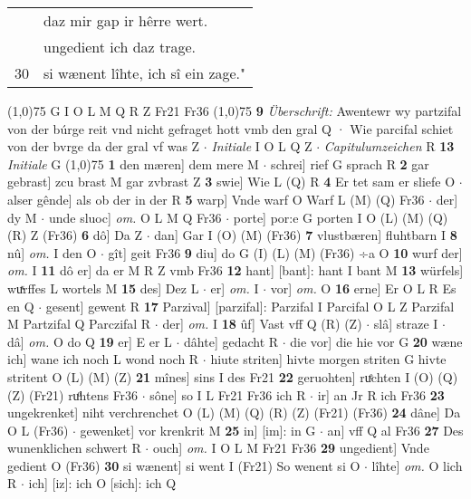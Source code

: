 \documentclass[8pt,a4paper,notitlepage]{article}
\begin{document}
\begin{table}[ht]
\begin{minipage}[t]{0.5\linewidth}
\begin{tabular}{rl}
 & daz mir gap ir hêrre wert.\\ 
 & ungedient ich daz trage.\\ 
30 & si wænent lîhte, ich sî ein zage."\\ 
\end{tabular}
\scriptsize
\line(1,0){75} \newline
G I O L M Q R Z Fr21 Fr36 \newline
\line(1,0){75} \newline
\textbf{9} \textit{Überschrift:} Awentewr wy partzifal von der búrge reit vnd nicht gefraget hott vmb den gral Q  · Wie parcifal schiet von der bvrge da der gral vf was Z   $\cdot$ \textit{Initiale} I O L Q Z   $\cdot$ \textit{Capitulumzeichen} R  \textbf{13} \textit{Initiale} G  \newline
\line(1,0){75} \newline
\textbf{1} den mæren] dem mere M  $\cdot$ schrei] rief G sprach R \textbf{2} gar gebrast] zcu brast M gar zvbrast Z \textbf{3} swie] Wie L (Q) R \textbf{4} Er tet sam er sliefe O  $\cdot$ alser gênde] als ob der in der R \textbf{5} warp] Vnde warf O Warf L (M) (Q) Fr36  $\cdot$ der] dy M  $\cdot$ unde sluoc] \textit{om.} O L M Q Fr36  $\cdot$ porte] por:e G porten I O (L) (M) (Q) (R) Z (Fr36) \textbf{6} dô] Da Z  $\cdot$ dan] Gar I (O) (M) (Fr36) \textbf{7} vlustbæren] fluhtbarn I \textbf{8} nû] \textit{om.} I den O  $\cdot$ gît] geit Fr36 \textbf{9} diu] do G (I) (L) (M) (Fr36) ÷a O \textbf{10} wurf der] \textit{om.} I \textbf{11} dô er] da er M R Z vmb Fr36 \textbf{12} hant] [bant]: hant I bant M \textbf{13} würfels] wuͯrffes L wortels M \textbf{15} des] Dez L  $\cdot$ er] \textit{om.} I  $\cdot$ vor] \textit{om.} O \textbf{16} erne] Er O L R Es en Q  $\cdot$ gesent] gewent R \textbf{17} Parzival] [parzifal]: Parzifal I Parcifal O L Z Parzifal M Partzifal Q Parczifal R  $\cdot$ der] \textit{om.} I \textbf{18} ûf] Vast vff Q (R) (Z)  $\cdot$ slâ] straze I  $\cdot$ dâ] \textit{om.} O do Q \textbf{19} er] E er L  $\cdot$ dâhte] gedacht R  $\cdot$ die vor] die hie vor G \textbf{20} wæne ich] wane ich noch L wond noch R  $\cdot$ hiute striten] hivte morgen striten G hivte stritent O (L) (M) (Z) \textbf{21} mînes] sins I des Fr21 \textbf{22} geruohten] ruͤchten I (O) (Q) (Z) (Fr21) ruͦhtens Fr36  $\cdot$ sône] so I L Fr21 Fr36 ich R  $\cdot$ ir] an Jr R ich Fr36 \textbf{23} ungekrenket] niht verchrenchet O (L) (M) (Q) (R) (Z) (Fr21) (Fr36) \textbf{24} dâne] Da O L (Fr36)  $\cdot$ gewenket] vor krenkrit M \textbf{25} in] [im]: in G  $\cdot$ an] vff Q al Fr36 \textbf{27} Des wunenklichen schwert R  $\cdot$ ouch] \textit{om.} I O L M Fr21 Fr36 \textbf{29} ungedient] Vnde gedient O (Fr36) \textbf{30} si wænent] si went I (Fr21) So wenent si O  $\cdot$ lîhte] \textit{om.} O lich R  $\cdot$ ich] [iz]: ich O [sich]: ich Q \newline

\end{minipage}
\end{table}
\end{document}
